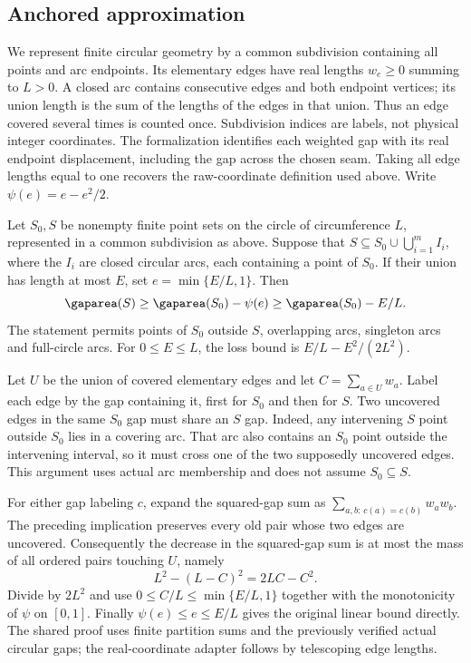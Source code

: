 \subsection{Anchored approximation}

We represent finite circular geometry by a common subdivision containing
all points and arc endpoints. Its elementary edges have real lengths
$w_e\ge0$ summing to $L>0$. A closed arc contains consecutive edges and
both endpoint vertices; its union length is the sum of the lengths of
the edges in that union. Thus an edge covered several times is counted
once. Subdivision indices are labels, not physical integer coordinates.
The formalization identifies each weighted gap with its real endpoint
displacement, including the gap across the chosen seam. Taking all edge
lengths equal to one recovers the raw-coordinate definition used above.
Write $\psi(e)=e-e^2/2$.

\begin{lemma}\label{lem:anchored-erosion}
Let $S_0,S$ be nonempty finite point sets on the circle of circumference
$L$, represented in a common subdivision as above. Suppose that
$S\subseteq S_0\cup\bigcup_{i=1}^m I_i$, where the $I_i$ are closed
circular arcs, each containing a point of $S_0$. If their union has
length at most $E$, set $e=\min\{E/L,1\}$. Then
\begin{equation}\label{eq:anchored-erosion}
 \gaparea(S)\ge\gaparea(S_0)-\psi(e)
             \ge\gaparea(S_0)-E/L.
\end{equation}
The statement permits points of $S_0$ outside $S$, overlapping arcs,
singleton arcs and full-circle arcs. For $0\le E\le L$, the loss bound is
$E/L-E^2/(2L^2)$.
\end{lemma}
\begin{outline}
Let $U$ be the union of covered elementary edges and let
$C=\sum_{a\in U}w_a$. Label each edge by the gap containing it, first
for $S_0$ and then for $S$. Two uncovered edges in the same $S_0$ gap
must share an $S$ gap. Indeed, any intervening $S$ point outside $S_0$
lies in a covering arc. That arc also contains an $S_0$ point outside
the intervening interval, so it must cross one of the two supposedly
uncovered edges. This argument uses actual arc membership and does not
assume $S_0\subseteq S$.

For either gap labeling $c$, expand the squared-gap sum as
$\sum_{a,b:\,c(a)=c(b)}w_aw_b$. The preceding implication preserves
every old pair whose two edges are uncovered. Consequently the decrease
in the squared-gap sum is at most the mass of all ordered pairs touching
$U$, namely
\[
 L^2-(L-C)^2=2LC-C^2.
\]
Divide by $2L^2$ and use $0\le C/L\le\min\{E/L,1\}$ together with
the monotonicity of $\psi$ on $[0,1]$. Finally $\psi(e)\le e\le E/L$
gives the original linear bound directly. The shared proof uses finite
partition sums and the previously verified actual circular gaps; the
real-coordinate adapter follows by telescoping edge lengths.
\end{outline}

